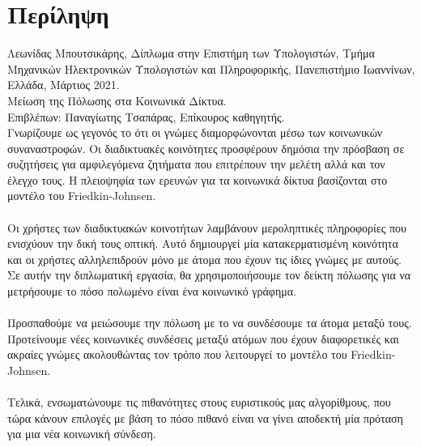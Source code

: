 \chapter*{Περίληψη}
Λεωνίδας Μπουτσικάρης, Δίπλωμα στην Επιστήμη των Υπολογιστών, Τμήμα Μηχανικών Ηλεκτρονικών Υπολογιστών και Πληροφορικής, Πανεπιστήμιο Ιωαννίνων, Ελλάδα, Μάρτιος 2021.
\\
Μείωση της  Πόλωσης στα Κοινωνικά Δίκτυα.
\\
Επιβλέπων: Παναγίωτης Τσαπάρας, Επίκουρος καθηγητής.
\\

\noindent Γνωρίζουμε ως γεγονός το ότι οι γνώμες διαμορφώνονται μέσω των κοινωνικών συναναστροφών. Οι διαδικτυακές κοινότητες προσφέρουν δημόσια την πρόσβαση σε συζητήσεις για αμφιλεγόμενα ζητήματα που επιτρέπουν την μελέτη αλλά και τον έλεγχο τους. Η πλειοψηφία των ερευνών για τα κοινωνικά δίκτυα βασίζονται στο μοντέλο του Friedkin-Johnsen.
\\
\\
Οι χρήστες των διαδικτυακών κοινοτήτων λαμβάνουν μεροληπτικές πληροφορίες που ενισχύουν την δική τους οπτική. Αυτό δημιουργεί μία κατακερματισμένη κοινότητα και οι χρήστες αλληλεπιδρούν μόνο με άτομα που έχουν τις ίδιες γνώμες με αυτούς. Σε αυτήν την διπλωματική εργασία, θα χρησιμοποιήσουμε τον δείκτη πόλωσης για να μετρήσουμε το πόσο πολωμένο είναι ένα κοινωνικό γράφημα.
\\
\\
Προσπαθούμε να μειώσουμε την πόλωση με το να συνδέσουμε τα άτομα μεταξύ τους. Προτείνουμε νέες κοινωνικές συνδέσεις μεταξύ ατόμων που έχουν διαφορετικές και ακραίες γνώμες ακολουθώντας τον τρόπο που λειτουργεί το μοντέλο του Friedkin-Johnsen.
\\
\\
Τελικά, ενσωματώνουμε τις πιθανότητες στους ευριστικούς μας αλγορίθμους, που τώρα κάνουν επιλογές με βάση το πόσο πιθανό είναι να γίνει αποδεκτή μία πρόταση για μια νέα κοινωνική σύνδεση.

\bigskip
